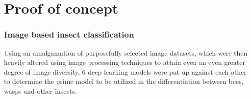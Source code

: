 \documentclass[12pt]{article}
\begin{document}
	\section{Proof of concept}
	\subsubsection{Image based insect classification}
	Using an amalgamation of purposefully selected image datasets, which were then heavily altered using image processing techniques to attain even an even greater degree of image diversity, 6 deep learning models were put up against each other to determine the prime model to be utilized in the differentiation between bees, wasps and other insects.
	
	\begin{enumerate}
		

\end{enumerate}
\end{document}

